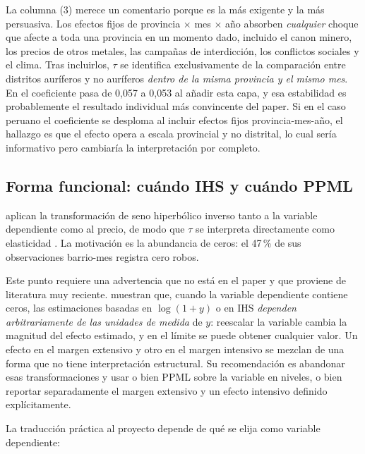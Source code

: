\documentclass[11pt,a4paper]{article}
\begin{document}
La columna (3) merece un comentario porque es la más exigente y la más persuasiva. Los efectos fijos de provincia $\times$ mes $\times$ año absorben \emph{cualquier} choque que afecte a toda una provincia en un momento dado, incluido el canon minero, los precios de otros metales, las campañas de interdicción, los conflictos sociales y el clima. Tras incluirlos, $\tau$ se identifica exclusivamente de la comparación entre distritos auríferos y no auríferos \emph{dentro de la misma provincia y el mismo mes}. En \citet{braakmann2024} el coeficiente pasa de 0{,}057 a 0{,}053 al añadir esta capa, y esa estabilidad es probablemente el resultado individual más convincente del paper. Si en el caso peruano el coeficiente se desploma al incluir efectos fijos provincia-mes-año, el hallazgo es que el efecto opera a escala provincial y no distrital, lo cual sería informativo pero cambiaría la interpretación por completo.

\subsection{Forma funcional: cuándo IHS y cuándo PPML}

\citet{braakmann2024} aplican la transformación de seno hiperbólico inverso tanto a la variable dependiente como al precio, de modo que $\tau$ se interpreta directamente como elasticidad \citep{bellemare2019}. La motivación es la abundancia de ceros: el 47\,\% de sus observaciones barrio-mes registra cero robos.

Este punto requiere una advertencia que no está en el paper y que proviene de literatura muy reciente. \citet{chen2024} muestran que, cuando la variable dependiente contiene ceros, las estimaciones basadas en $\log(1+y)$ o en IHS \emph{dependen arbitrariamente de las unidades de medida} de $y$: reescalar la variable cambia la magnitud del efecto estimado, y en el límite se puede obtener cualquier valor. Un efecto en el margen extensivo y otro en el margen intensivo se mezclan de una forma que no tiene interpretación estructural. Su recomendación es abandonar esas transformaciones y usar o bien PPML sobre la variable en niveles, o bien reportar separadamente el margen extensivo y un efecto intensivo definido explícitamente.

La traducción práctica al proyecto depende de qué se elija como variable dependiente:
\end{document}
